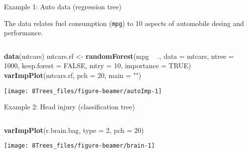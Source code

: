 \documentclass[10pt,ignorenonframetext,]{beamer}
\newenvironment{Shaded}{\begin{snugshade}}{\end{snugshade}}
\newcommand{\DataTypeTok}[1]{\textcolor[rgb]{0.13,0.29,0.53}{#1}}
\newcommand{\DecValTok}[1]{\textcolor[rgb]{0.00,0.00,0.81}{#1}}
\newcommand{\KeywordTok}[1]{\textcolor[rgb]{0.13,0.29,0.53}{\textbf{#1}}}
\newcommand{\NormalTok}[1]{#1}
\newcommand{\OperatorTok}[1]{\textcolor[rgb]{0.81,0.36,0.00}{\textbf{#1}}}
\newcommand{\OtherTok}[1]{\textcolor[rgb]{0.56,0.35,0.01}{#1}}
\newcommand{\StringTok}[1]{\textcolor[rgb]{0.31,0.60,0.02}{#1}}
\begin{document}
\begin{frame}[fragile]

\begin{block}{Example 1: Auto data (regression tree)}

\vspace{1mm}

The data relates fuel consumption (\texttt{mpg}) to 10 aspects of
automobile desing and performance.

\vspace{2mm}

\(~\)

\scriptsize

\begin{Shaded}
\begin{Highlighting}[]
\KeywordTok{data}\NormalTok{(mtcars)}
\NormalTok{mtcars.rf <-}\StringTok{ }\KeywordTok{randomForest}\NormalTok{(mpg }\OperatorTok{~}\StringTok{ }\NormalTok{., }\DataTypeTok{data =}\NormalTok{ mtcars, }\DataTypeTok{ntree =} \DecValTok{1000}\NormalTok{, }\DataTypeTok{keep.forest =} \OtherTok{FALSE}\NormalTok{, }
    \DataTypeTok{mtry =} \DecValTok{10}\NormalTok{, }\DataTypeTok{importance =} \OtherTok{TRUE}\NormalTok{)}
\KeywordTok{varImpPlot}\NormalTok{(mtcars.rf, }\DataTypeTok{pch =} \DecValTok{20}\NormalTok{, }\DataTypeTok{main =} \StringTok{""}\NormalTok{)}
\end{Highlighting}
\end{Shaded}

\begin{center}\texttt{[image: 8Trees\_files/figure-beamer/autoImp-1]} \end{center}

\end{block}

\end{frame}

\begin{frame}[fragile]

\begin{block}{Example 2: Head injury (classification tree)}

\vspace{1mm}

\(~\)

\scriptsize

\begin{Shaded}
\begin{Highlighting}[]
\KeywordTok{varImpPlot}\NormalTok{(r.brain.bag, }\DataTypeTok{type =} \DecValTok{2}\NormalTok{, }\DataTypeTok{pch =} \DecValTok{20}\NormalTok{)}
\end{Highlighting}
\end{Shaded}

\begin{center}\texttt{[image: 8Trees\_files/figure-beamer/brain-1]} \end{center}

\end{block}

\end{frame}
\end{document}
